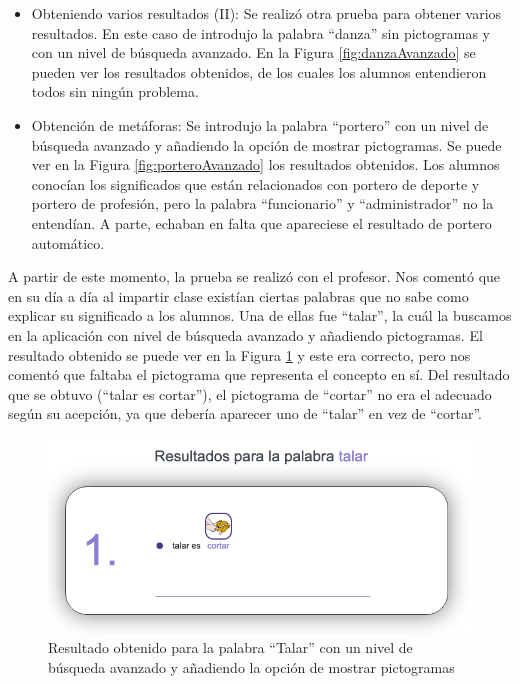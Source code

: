 \begin{itemize}
	\item  Obteniendo varios resultados (II):  Se realizó otra prueba para obtener varios resultados. En este caso de introdujo la palabra ``danza''  sin pictogramas y con un nivel de búsqueda avanzado. En la Figura \ref{fig:danzaAvanzado} se pueden ver los resultados obtenidos, de los cuales los alumnos entendieron todos sin ningún problema.
	
	\item  Obtención de metáforas:  Se introdujo la palabra ``portero'' con un nivel de búsqueda avanzado y añadiendo la opción de mostrar pictogramas. Se puede ver en la Figura \ref{fig:porteroAvanzado} los resultados obtenidos. Los alumnos conocían los significados que están relacionados con portero de deporte y portero de profesión, pero la palabra ``funcionario'' y ``administrador'' no la entendían. A parte, echaban en falta que apareciese el resultado de portero automático.
\end{itemize}


A partir de este momento, la prueba se realizó con el profesor. Nos comentó que en su día a día al impartir clase existían ciertas palabras que no sabe como explicar su significado a los alumnos.
Una de ellas fue ``talar'', la cuál la buscamos en la aplicación con nivel de búsqueda avanzado y añadiendo pictogramas. El resultado obtenido se puede ver en la Figura \ref{fig:talarAvanzado} y este era correcto, pero nos comentó que faltaba el pictograma que representa el concepto en sí. Del resultado que se obtuvo (``talar es cortar''), el pictograma de ``cortar'' no era el adecuado según su acepción, ya que debería aparecer uno de ``talar'' en vez de ``cortar''.

\begin{figure}[!h]
	\includegraphics[width=.7\textwidth]{Imagenes/Bitmap/Capitulo4/EvaluacionFinal/talaravanzado.png}
	\centering
	\caption{Resultado obtenido para la palabra ``Talar'' con un nivel de búsqueda avanzado y añadiendo la opción de mostrar pictogramas}
	\label{fig:talarAvanzado}
\end{figure}

